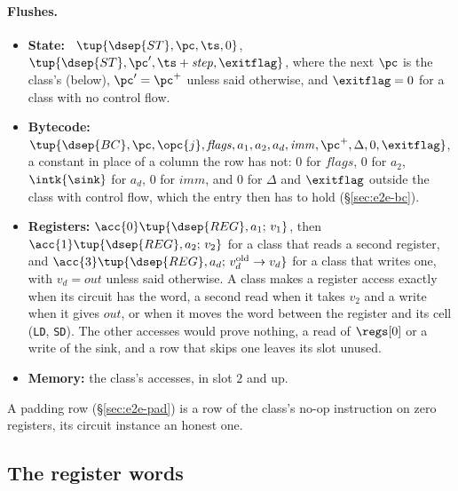 \paragraph{Flushes.}
\begin{itemize}
  \item \textbf{State:} \pull\ $\tup{\dsep{ST},\pc,\ts,0}$, \push\ $\tup{\dsep{ST},\pc',\ts+\mathit{step},\exitflag}$, where the next $\pc$ is the class's (below), $\pc'=\pc^{+}$ unless said otherwise, and $\exitflag=0$ for a class with no control flow.
  \item \textbf{Bytecode:} \pull\ $\tup{\dsep{BC},\pc,\opc{j},\mathit{flags},a_1,a_2,a_d,\mathit{imm},\pc^{+},\Delta,0,\exitflag}$, a constant in place of a column the row has not: $0$ for $\mathit{flags}$, $0$ for $a_2$, $\intk{\sink}$ for $a_d$, $0$ for $\mathit{imm}$, and $0$ for $\Delta$ and $\exitflag$ outside the class with control flow, which the entry then has to hold (\S\ref{sec:e2e-bc}).
  \item \textbf{Registers:} $\acc{0}\tup{\dsep{REG},a_1;\,v_1}$, then $\acc{1}\tup{\dsep{REG},a_2;\,v_2}$ for a class that reads a second register, and $\acc{3}\tup{\dsep{REG},a_d;\,v_d^{\mathrm{old}}\to v_d}$ for a class that writes one, with $v_d=\mathit{out}$ unless said otherwise. A class makes a register access exactly when its circuit has the word, a second read when it takes $v_2$ and a write when it gives $\mathit{out}$, or when it moves the word between the register and its cell (\texttt{LD}, \texttt{SD}). The other accesses would prove nothing, a read of $\regs[0]$ or a write of the sink, and a row that skips one leaves its slot unused.
  \item \textbf{Memory:} the class's accesses, in slot $2$ and up.
\end{itemize}
A padding row (\S\ref{sec:e2e-pad}) is a row of the class's no-op instruction on zero registers, its circuit instance an honest one.

\subsection{The register words}\label{sec:regpack}

